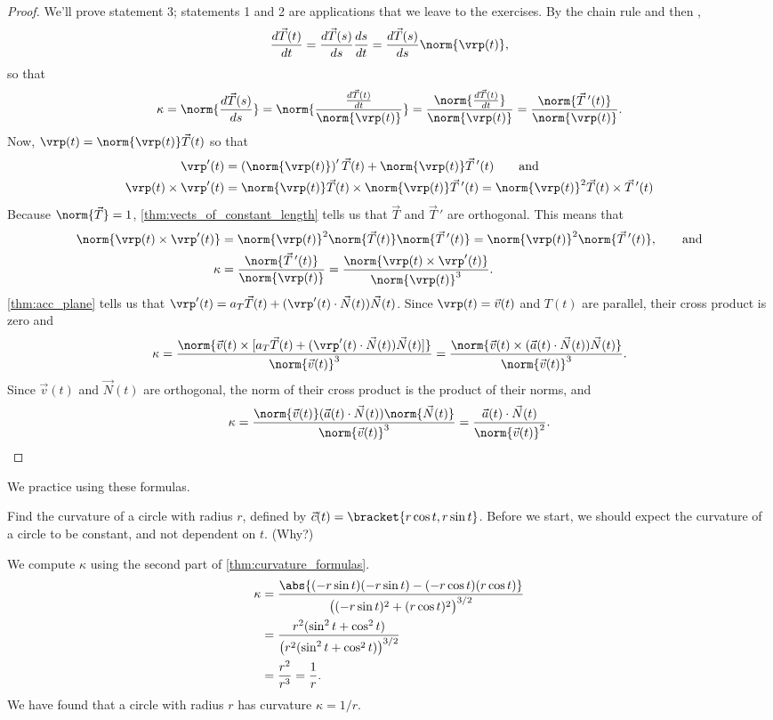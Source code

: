 \begin{proof}
We'll prove statement 3; statements 1 and 2 are applications that we leave to the exercises.  By the chain rule and then ,
\[
\frac{d\vec T(t)}{dt}
=\frac{d\vec T(s)}{ds}\frac{ds}{dt}
=\frac{d\vec T(s)}{ds}\norm{\vrp(t)},
\]
so that
\[
\kappa=\norm{\frac{d\vec T(s)}{ds}}
=\norm{\frac{\frac{d\vec T(t)}{dt}}{\norm{\vrp(t)}}}
=\frac{\norm{\frac{d\vec T(t)}{dt}}}{\norm{\vrp(t)}}
=\frac{\norm{\vec T\,'(t)}}{\norm{\vrp(t)}}.
\]
Now, $\vrp(t)=\norm{\vrp(t)}\vec T(t)$ so that
\begin{align*}
 \vrp'(t)&=\left(\norm{\vrp(t)}\right)'\vec T(t)+\norm{\vrp(t)}\vec T\,'(t)
 \qquad\text{and}\\
 \vrp(t)\times\vrp'(t)
 &=\norm{\vrp(t)}\vec T(t)\times\norm{\vrp(t)}\vec T\,'(t)
 =\norm{\vrp(t)}^2\vec T(t)\times\vec T\,'(t)
\end{align*}
Because $\norm{\vec T}=1$, \autoref{thm:vects_of_constant_length} tells us that $\vec T$ and $\vec T\,'$ are orthogonal.  This means that
\begin{align*}
 \norm{\vrp(t)\times\vrp'(t)}
 &=\norm{\vrp(t)}^2\norm{\vec T(t)}\norm{\vec T\,'(t)}
 =\norm{\vrp(t)}^2\norm{\vec T\,'(t)},\qquad\text{and}\\
 \kappa
 &=\frac{\norm{\vec T\,'(t)}}{\norm{\vrp(t)}}
 =\frac{\norm{\vrp(t)\times\vrp'(t)}}{\norm{\vrp(t)}^3}.
\end{align*}
\autoref{thm:acc_plane} tells us that $\vrp'(t)=a_T\vec T(t)+(\vrp'(t)\cdot\vec N(t))\vec N(t)$.  Since $\vrp(t)=\vec v(t)$ and $T(t)$ are parallel, their cross product is zero and
\[
 \kappa
 =\frac{\norm{\vec v(t)\times[a_T\vec T(t)+(\vrp'(t)\cdot\vec N(t))\vec N(t)]}}
 {\norm{\vec v(t)}^3}
 =\frac{\norm{\vec v(t)\times(\vec a(t)\cdot\vec N(t))\vec N(t)}}{\norm{\vec v(t)}^3}.
\]
Since $\vec v(t)$ and $\vec N(t)$ are orthogonal, the norm of their cross product is the product of their norms, and
\[
\kappa
=\frac{\norm{\vec v(t)}(\vec a(t)\cdot\vec N(t))\norm{\vec N(t)}}{\norm{\vec v(t)}^3}
=\frac{\vec a(t)\cdot\vec N(t)}{\norm{\vec v(t)}^2}.\qedhere
\]
\end{proof}

We practice using these formulas.

\begin{example}\label{ex_curvature2}
Find the curvature of a circle with radius $r$, defined by $\vec c(t) =\bracket{r\cos t,r\sin t}$.
\solution
Before we start, we should expect the curvature of a circle to be constant, and not dependent on $t$. (Why?)

We compute $\kappa$ using the second part of \autoref{thm:curvature_formulas}.
\begin{align*}
	\kappa
	&= \frac{\abs{(-r\sin t)(-r\sin t) - (-r\cos t)(r\cos t)}}{\big( (-r\sin t)^2+(r\cos t)^2\big)^{3/2}} \smallskip\\
	&= \frac{r^2(\sin^2t+\cos^2t)}{\big(r^2(\sin^2t+\cos^2t)\big)^{3/2}}\smallskip\\
	&= \frac{r^2}{r^3} = \frac1r.
\end{align*}
We have found that a circle with radius $r$ has curvature $\kappa = 1/r$.
\end{example}

